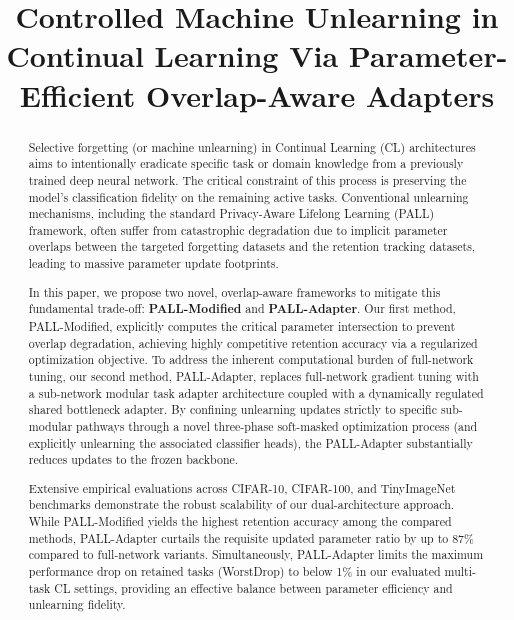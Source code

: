 \documentclass[conference]{IEEEtran}
\theoremstyle{plain}
\theoremstyle{definition}
\theoremstyle{remark}
\begin{document}
\title{Controlled Machine Unlearning in Continual Learning Via Parameter-Efficient Overlap-Aware Adapters}

\maketitle

\begin{abstract}
Selective forgetting (or machine unlearning) in Continual Learning (CL) architectures aims to intentionally eradicate specific task or domain knowledge from a previously trained deep neural network. The critical constraint of this process is preserving the model's classification fidelity on the remaining active tasks. Conventional unlearning mechanisms, including the standard Privacy-Aware Lifelong Learning (PALL) framework, often suffer from catastrophic degradation due to implicit parameter overlaps between the targeted forgetting datasets and the retention tracking datasets, leading to massive parameter update footprints.

In this paper, we propose two novel, overlap-aware frameworks to mitigate this fundamental trade-off: \textbf{PALL-Modified} and \textbf{PALL-Adapter}. Our first method, PALL-Modified, explicitly computes the critical parameter intersection to prevent overlap degradation, achieving highly competitive retention accuracy via a regularized optimization objective. To address the inherent computational burden of full-network tuning, our second method, PALL-Adapter, replaces full-network gradient tuning with a sub-network modular task adapter architecture coupled with a dynamically regulated shared bottleneck adapter. By confining unlearning updates strictly to specific sub-modular pathways through a novel three-phase soft-masked optimization process (and explicitly unlearning the associated classifier heads), the PALL-Adapter substantially reduces updates to the frozen backbone.

Extensive empirical evaluations across CIFAR-10, CIFAR-100, and TinyImageNet benchmarks demonstrate the robust scalability of our dual-architecture approach. While PALL-Modified yields the highest retention accuracy among the compared methods, PALL-Adapter curtails the requisite updated parameter ratio by up to 87\% compared to full-network variants. Simultaneously, PALL-Adapter limits the maximum performance drop on retained tasks (WorstDrop) to below 1\% in our evaluated multi-task CL settings, providing an effective balance between parameter efficiency and unlearning fidelity.
\end{abstract}
\end{document}
